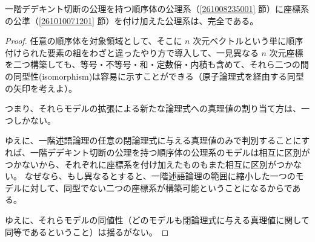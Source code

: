 
\begin{thm2}
  一階デデキント切断の公理を持つ順序体の公理系（\ref{261008235001} 節）に座標系の公準（\ref{261010071201} 節）を付け加えた公理系は、完全である。
\end{thm2}

\begin{proof}
  任意の順序体を対象領域として、そこに \(n\) 次元ベクトルという単に順序付けられた要素の組をわざと違ったやり方で導入して、一見異なる \(n\) 次元座標を二つ構築しても、等号・不等号・和・定数倍・内積も含めて、それら二つの間の同型性(isomorphism)は容易に示すことができる（原子論理式を経由する同型の矢印を考えよ）。

  つまり、それらモデルの拡張による新たな論理式への真理値の割り当て方は、一つしかない。

  ゆえに、一階述語論理の任意の閉論理式に与える真理値のみで判別することにすれば、一階デデキント切断の公理を持つ順序体の公理系のモデルは相互に区別がつかないから、それぞれに座標系を付け加えたものもまた相互に区別がつかない。
  なぜなら、もし異なるとすると、一階述語論理の範囲に縮小した一つのモデルに対して、同型でない二つの座標系が構築可能ということになるからである。

  ゆえに、それらモデルの同値性（どのモデルも閉論理式に与える真理値に関して同等であるということ）は揺るがない。
\end{proof}
